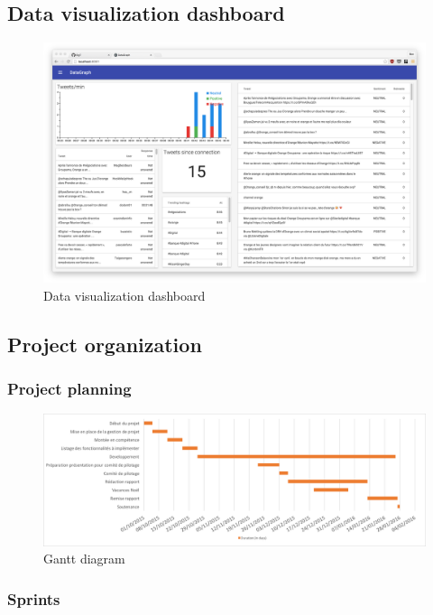 \documentclass[11pt]{article}
\begin{document}
\subsection{Data visualization dashboard}

\begin{figure}[h!]
    \centering
    \includegraphics[scale=0.13]{img/dataviz.png}
    \caption{Data visualization dashboard}
    \label{dataviz}
\end{figure}

\subsection{Project organization}

\subsubsection{Project planning}

\begin{figure}[h!]
    \centering
    \includegraphics[scale=0.5]{img/gantt.png}
    \caption{Gantt diagram}
    \label{gantt}
\end{figure}

\newpage
\subsubsection{Sprints}
\end{document}
